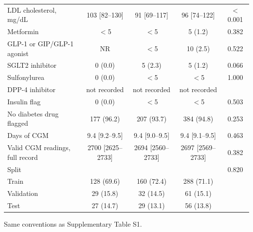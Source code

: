 \begin{table}[htbp]
\begin{tabular}{lcccc}
LDL cholesterol, mg/dL & 103 [82--130] & 91 [69--117] & 96 [74--122] & $<$0.001 \\
Metformin & $<$5 & $<$5 & 5 (1.2) & 0.382 \\
GLP-1 or GIP/GLP-1 agonist & NR & $<$5 & 10 (2.5) & 0.522 \\
SGLT2 inhibitor & 0 (0.0) & 5 (2.3) & 5 (1.2) & 0.066 \\
Sulfonylurea & 0 (0.0) & $<$5 & $<$5 & 1.000 \\
DPP-4 inhibitor & not recorded & not recorded & not recorded &  \\
Insulin flag & 0 (0.0) & $<$5 & $<$5 & 0.503 \\
No diabetes drug flagged & 177 (96.2) & 207 (93.7) & 384 (94.8) & 0.253 \\
Days of CGM & 9.4 [9.2--9.5] & 9.4 [9.0--9.5] & 9.4 [9.1--9.5] & 0.463 \\
Valid CGM readings, full record & 2700 [2625--2733] & 2694 [2560--2733] & 2697 [2569--2733] & 0.382 \\
Split &  &  &  & 0.820 \\
\hspace{1em}Train & 128 (69.6) & 160 (72.4) & 288 (71.1) &  \\
\hspace{1em}Validation & 29 (15.8) & 32 (14.5) & 61 (15.1) &  \\
\hspace{1em}Test & 27 (14.7) & 29 (13.1) & 56 (13.8) &  \\
\bottomrule
\end{tabular}
\par\smallskip
\begin{minipage}{\linewidth}\scriptsize
Same conventions as Supplementary Table S1.
\end{minipage}
\end{table}

